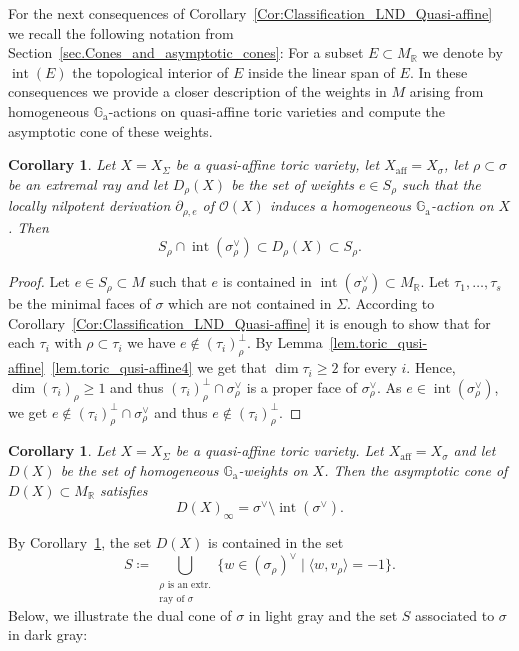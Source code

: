 \documentclass[JEP,XML,SOM,Unicode]{cedram}
\let\mathcal\mathscr
\newcommand{\ra}{\mathrm{a}}
\let\oldvee\vee
\renewcommand{\vee}{{\scriptscriptstyle\oldvee}}
\let\oldbot\bot
\renewcommand{\bot}{{\scriptscriptstyle\oldbot}}
\theoremstyle{plain}
\newtheorem{corollary}[theorem]{Corollary}
\theoremstyle{definition}
\DeclareMathOperator{\aff}{aff}
\DeclareMathOperator{\inter}{int}
\newcommand{\OO}{\mathcal{O}}
\newcommand{\GG}{\mathbb{G}}
\newcommand{\RR}{\mathbb{R}}
\newcommand{\set}[2]{\{#1 \mid #2\}}
\newcommand{\sprod}[2]{\langle #1, #2 \rangle}
\begin{document}
For the next consequences of Corollary~\ref{Cor:Classification_LND_Quasi-affine} we recall the
following notation from Section~\ref{sec.Cones_and_asymptotic_cones}: For a
subset $E \subset M_{\RR}$ we denote by $\inter(E)$ the topological interior of $E$
inside the linear span of $E$. In these consequences we provide a closer
description of the weights in $M$ arising from homogeneous $\GG_\ra$-actions on quasi-affine toric varieties
and compute the asymptotic cone of these weights.

\begin{corollary}
\label{cor.Weights_rho}
Let $X = X_{\Sigma}$ be a quasi-affine toric variety, let $X_{\aff}=X_{\sigma}$, let
$\rho \subset \sigma$ be an extremal ray and let $D_{\rho}(X)$
be the set of weights $e \in S_\rho$ such that the locally nilpotent derivation
$\partial_{\rho, e}$ of $\OO(X)$ induces a homogeneous $\GG_\ra$-action on $X$. Then
\[
S_{\rho} \cap \inter(\sigma_{\rho}^\vee) \subset
D_{\rho}(X) \subset S_\rho.
\]
\end{corollary}

\begin{proof}
Let $e \in S_{\rho} \subset M$ such that $e$ is contained in
$\inter(\sigma_{\rho}^\vee) \subset M_{\RR}$.
Let $\tau_1, \ldots, \tau_s$ be the minimal faces of $\sigma$ which are not contained in $\Sigma$.
According to Corollary~\ref{Cor:Classification_LND_Quasi-affine} it is enough to show that for each $\tau_i$
with $\rho \subset \tau_i$ we have $e \not\in (\tau_i)_{\rho}^\bot$. By
Lemma~\ref{lem.toric_qusi-affine}~\eqref{lem.toric_qusi-affine4} we get that $\dim \tau_i \geq 2$
for every $i$. Hence, $\dim (\tau_i)_\rho \geq 1$
and thus $(\tau_i)_\rho^\bot \cap \sigma_\rho^\vee$ is a proper face of $\sigma_\rho^\vee$. As
$e \in \inter(\sigma_\rho^\vee)$, we get
$e \not\in (\tau_i)_\rho^\bot \cap \sigma_\rho^\vee$ and thus $e \not\in (\tau_i)_\rho^\bot$.
\end{proof}

\begin{corollary}
\label{cor.Weights}
Let $X = X_\Sigma$ be a quasi-affine toric variety. Let $X_{\aff} = X_{\sigma}$
and let $D(X)$ be the set of homogeneous $\GG_\ra$-weights on $X$.
Then the asymptotic cone of
$D(X) \subset M_{\RR}$ satisfies
\[
D(X)_{\infty} = \sigma^\vee \setminus \inter(\sigma^\vee).
\]
\end{corollary}

By Corollary~\ref{cor.Weights_rho}, the set $D(X)$ is contained in
the set
\[
S \coloneqq \bigcup_{\substack{
\textrm{$\rho$ is an extr.} \\
\textrm{ray of $\sigma$}
}} \set{w \in (\sigma_\rho)^\vee}{\sprod{w}{v_\rho} = -1}.
\]
Below, we illustrate the dual cone of $\sigma$ in light gray
and the set $S$ associated to $\sigma$ in dark gray:
\end{document}
